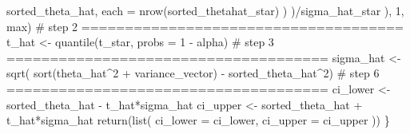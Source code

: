 \documentclass[
  12pt,
  a4paper,
]{article}
\newenvironment{Shaded}{\begin{snugshade}}{\end{snugshade}}
\newcommand{\AttributeTok}[1]{\textcolor[rgb]{0.00,0.34,0.68}{#1}}
\newcommand{\CommentTok}[1]{\textcolor[rgb]{0.54,0.53,0.53}{#1}}
\newcommand{\DecValTok}[1]{\textcolor[rgb]{0.69,0.50,0.00}{#1}}
\newcommand{\FunctionTok}[1]{\textcolor[rgb]{0.39,0.29,0.61}{#1}}
\newcommand{\NormalTok}[1]{\textcolor[rgb]{0.12,0.11,0.11}{#1}}
\newcommand{\OtherTok}[1]{\textcolor[rgb]{0.00,0.43,0.16}{#1}}
\newcommand{\SpecialCharTok}[1]{\textcolor[rgb]{0.24,0.68,0.91}{#1}}
\numberwithin{equation}{section}
\begin{document}
\begin{Shaded}
\begin{Highlighting}[]
\NormalTok{          sorted\_theta\_hat,}
          \AttributeTok{each =} \FunctionTok{nrow}\NormalTok{(sorted\_thetahat\_star)}
\NormalTok{          )}
\NormalTok{        )}\SpecialCharTok{/}\NormalTok{sigma\_hat\_star}
\NormalTok{      ),}
    \DecValTok{1}\NormalTok{, }
\NormalTok{    max)}
  \CommentTok{\# step 2 =====================================}
\NormalTok{  t\_hat }\OtherTok{\textless{}{-}} \FunctionTok{quantile}\NormalTok{(t\_star, }\AttributeTok{probs =} \DecValTok{1} \SpecialCharTok{{-}}\NormalTok{ alpha)}
  \CommentTok{\# step 3 =====================================}
\NormalTok{  sigma\_hat }\OtherTok{\textless{}{-}} \FunctionTok{sqrt}\NormalTok{(}
    \FunctionTok{sort}\NormalTok{(theta\_hat}\SpecialCharTok{\^{}}\DecValTok{2} \SpecialCharTok{+}\NormalTok{ variance\_vector) }\SpecialCharTok{{-}}\NormalTok{ sorted\_theta\_hat}\SpecialCharTok{\^{}}\DecValTok{2}\NormalTok{)}
  \CommentTok{\# step 6 =====================================}
\NormalTok{  ci\_lower }\OtherTok{\textless{}{-}}\NormalTok{ sorted\_theta\_hat }\SpecialCharTok{{-}}\NormalTok{ t\_hat}\SpecialCharTok{*}\NormalTok{sigma\_hat}
\NormalTok{  ci\_upper }\OtherTok{\textless{}{-}}\NormalTok{ sorted\_theta\_hat }\SpecialCharTok{+}\NormalTok{ t\_hat}\SpecialCharTok{*}\NormalTok{sigma\_hat}
  \FunctionTok{return}\NormalTok{(}\FunctionTok{list}\NormalTok{(}
    \AttributeTok{ci\_lower =}\NormalTok{ ci\_lower,}
    \AttributeTok{ci\_upper =}\NormalTok{ ci\_upper}
\NormalTok{  ))}
\NormalTok{\}}


\end{Highlighting}
\end{Shaded}
\end{document}
